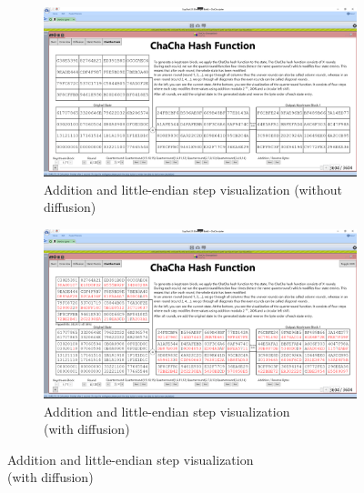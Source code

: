 \begin{figure}
\centering
\begin{subfigure}{\textwidth}
  \centering
  \includegraphics[width=\textwidth]{figures/ct2/chachahash/chachahash-end.png}
  \caption{Addition and little-endian step visualization (without diffusion)}
  \label{fig:chachahash.end.without.diffusion}
\end{subfigure}
\begin{subfigure}[t]{\textwidth}
  \centering
  \includegraphics[width=\textwidth]{figures/ct2/chachahash/chachahash-end-diffusion.png}
  \caption{Addition and little-endian step visualization\\(with diffusion)}
  \label{fig:chachahash.end.with.diffusion}
\end{subfigure}
\end{figure}
